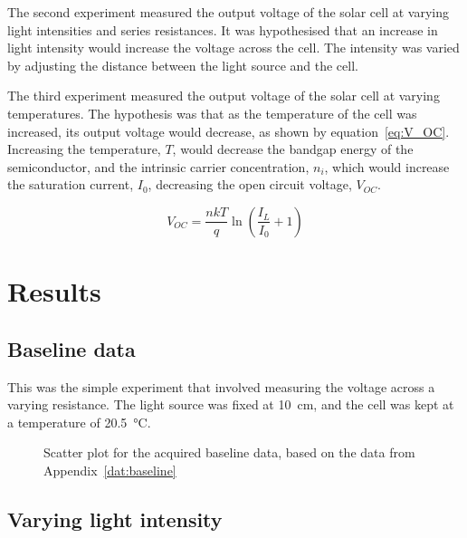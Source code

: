 \documentclass[a4paper,11pt]{article}
\begin{document}
The second experiment measured the output voltage of the solar cell at varying light intensities and series resistances. It was hypothesised that an increase in light intensity would increase the voltage across the cell. The intensity was varied by adjusting the distance between the light source and the cell.

The third experiment measured the output voltage of the solar cell at varying temperatures. The hypothesis was that as the temperature of the cell was increased, its output voltage would decrease, as shown by equation~\ref{eq:V_OC}. Increasing the temperature, $T$, would decrease the bandgap energy of the semiconductor, and the intrinsic carrier concentration, $n_i$, which would increase the saturation current, $I_0$, decreasing the open circuit voltage, $V_{OC}$.

\begin{equation} \label{eq:V_OC}
V_{OC} = \frac{nkT}{q}\ln{\left(\frac{I_L}{I_0} + 1\right)}
\end{equation}


\section{Results}
\subsection{Baseline data}

This was the simple experiment that involved measuring the voltage across a varying resistance. The light source was fixed at \SI{10}{\centi\metre}, and the cell was kept at a temperature of \SI{20.5}{\celsius}.

\begin{figure}[h]
\label{plot:baseline}
\caption{Scatter plot for the acquired baseline data, based on the data from Appendix~\ref{dat:baseline}}
\end{figure}

\subsection{Varying light intensity}
\end{document}
